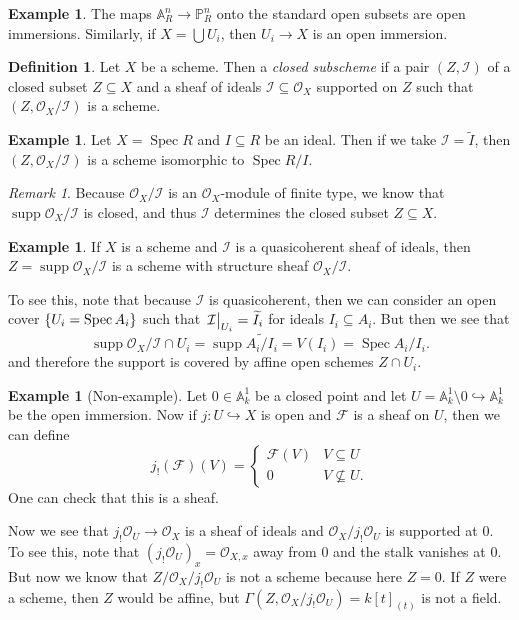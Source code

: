 \documentclass[leqno, openany]{memoir}
\theoremstyle{definition}
\newtheorem{defn}[thm]{Definition}
\newtheorem{exm}[thm]{Example}
\theoremstyle{remark}
\newtheorem{rmk}[thm]{Remark}
\theoremstyle{plain}
\theoremstyle{definition}
\theoremstyle{remark}
\newcommand{\A}{\mathbb{A}}
\renewcommand{\P}{\mathbb{P}}
\newcommand{\mc}[1]{\mathcal{#1}}
\newcommand{\wt}[1]{\widetilde{#1}}
\DeclareMathOperator{\supp}{supp}
\DeclareMathOperator{\Spec}{Spec}
\begin{document}
\begin{exm}
    The maps $\A^n_R \to \P^n_R$ onto the standard open subsets are open immersions. Similarly, if $X = \bigcup U_i$, then $U_i \to X$ is an open immersion.
\end{exm}

\begin{defn}
    Let $X$ be a scheme. Then a \textit{closed subscheme} if a pair $(Z, \mc{I})$ of a closed subset $Z \subseteq X$ and a sheaf of ideals $\mc{I} \subseteq \mc{O}_X$ supported on $Z$ such that $(Z, \mc{O}_X / \mc{I})$ is a scheme.
\end{defn}

\begin{exm}
    Let $X = \Spec R$ and $I \subseteq R$ be an ideal. Then if we take $\mc{I} = \wt{I}$, then $(Z, \mc{O}_X / \mc{I})$ is a scheme isomorphic to $\Spec R/I$.
\end{exm}

\begin{rmk}
    Because $\mc{O}_X / \mc{I}$ is an $\mc{O}_X$-module of finite type, we know that $\supp \mc{O}_X/\mc{I}$ is closed, and thus $\mc{I}$ determines the closed subset $Z \subseteq X$.
\end{rmk}

\begin{exm}
    If $X$ is a scheme and $\mc{I}$ is a quasicoherent sheaf of ideals, then $Z = \supp \mc{O}_X / \mc{I}$ is a scheme with structure sheaf $\mc{O}_X/\mc{I}$.

    To see this, note that because $\mc{I}$ is quasicoherent, then we can consider an open cover $\qty{U_i = \Spec A_i}$ such that $\eval{\mc{I}}_{U_i} = \wt{I}_i$ for ideals $I_i \subseteq A_i$. But then we see that
    \[ \supp \mc{O}_X/\mc{I} \cap U_i = \supp \wt{A_i/I_i} = V(I_i) = \Spec A_i/I_i. \]
    and therefore the support is covered by affine open schemes $Z \cap U_i$.
\end{exm}

\begin{exm}[Non-example]
    Let $0 \in \A^1_k$ be a closed point and let $U = \A^1_k \setminus \qty{0} \hookrightarrow \A^1_k$ be the open immersion. Now if $j \colon U \hookrightarrow X$ is open and $\mc{F}$ is a sheaf on $U$, then we can define
    \[ j_! (\mc{F})(V) = \begin{cases}
        \mc{F}(V) & V \subseteq U \\
        0 & V \not\subseteq U.
    \end{cases} \]
    One can check that this is a sheaf.
    
    Now we see that $j_! \mc{O}_U \to \mc{O}_X$ is a sheaf of ideals and $\mc{O}_X/j_! \mc{O}_U$ is supported at $0$. To see this, note that ${ ( j_! \mc{O}_U ) }_x = \mc{O}_{X,x}$ away from $0$ and the stalk vanishes at $0$. But now we know that $Z/\mc{O}_X/j_! \mc{O}_U$ is not a scheme because here $Z = \qty{0}$. If $Z$ were a scheme, then $Z$ would be affine, but $\Gamma(Z, \mc{O}_X/j_! \mc{O}_U) = { k[t] }_(t)$ is not a field.
\end{exm}
\end{document}
